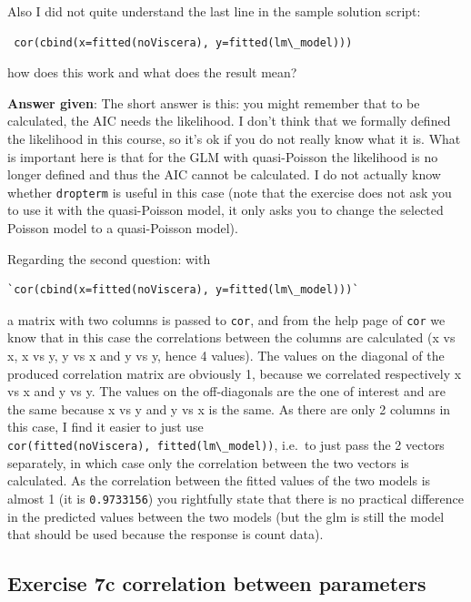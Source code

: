 \documentclass[
  letterpaper,
  8pt,
  a4paper]{book}
\begin{document}
Also I did not quite understand the last line in the sample solution
script:

\begin{verbatim}
 cor(cbind(x=fitted(noViscera), y=fitted(lm\_model)))
\end{verbatim}

how does this work and what does the result mean?

\textbf{Answer given}: The short answer is this: you might remember that
to be calculated, the AIC needs the likelihood. I don't think that we
formally defined the likelihood in this course, so it's ok if you do not
really know what it is. What is important here is that for the GLM with
quasi-Poisson the likelihood is no longer defined and thus the AIC
cannot be calculated. I do not actually know whether \texttt{dropterm}
is useful in this case (note that the exercise does not ask you to use
it with the quasi-Poisson model, it only asks you to change the selected
Poisson model to a quasi-Poisson model).

Regarding the second question: with

\begin{verbatim}
`cor(cbind(x=fitted(noViscera), y=fitted(lm\_model)))` 
\end{verbatim}

a matrix with two columns is passed to \texttt{cor}, and from the help
page of \texttt{cor} we know that in this case the correlations between
the columns are calculated (x vs x, x vs y, y vs x and y vs y, hence 4
values). The values on the diagonal of the produced correlation matrix
are obviously 1, because we correlated respectively x vs x and y vs y.
The values on the off-diagonals are the one of interest and are the same
because x vs y and y vs x is the same. As there are only 2 columns in
this case, I find it easier to just use
\texttt{cor(fitted(noViscera),\ fitted(lm\textbackslash{}\_model))},
i.e.~to just pass the 2 vectors separately, in which case only the
correlation between the two vectors is calculated. As the correlation
between the fitted values of the two models is almost 1 (it is
\texttt{0.9733156}) you rightfully state that there is no practical
difference in the predicted values between the two models (but the glm
is still the model that should be used because the response is count
data).

\subsection*{Exercise 7c correlation between
parameters}\label{exercise-7c-correlation-between-parameters}
\end{document}
